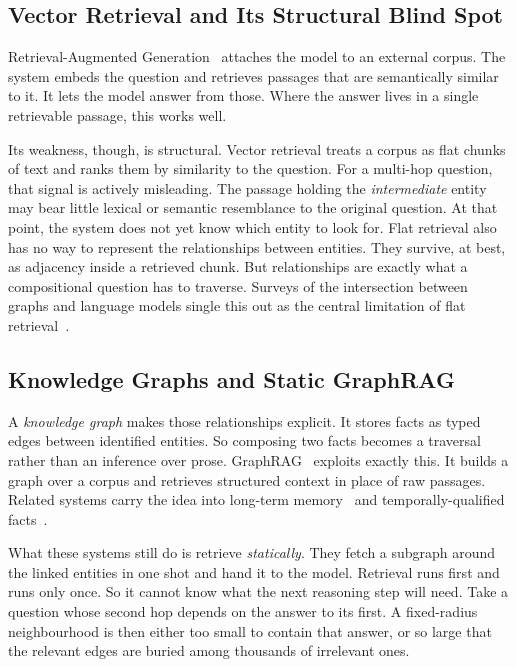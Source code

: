 \subsection{Vector Retrieval and Its Structural Blind Spot}

Retrieval-Augmented Generation~\cite{lewis2020retrieval} attaches the model to
an external corpus. The system embeds the question and retrieves passages that
are semantically similar to it. It lets the model answer from those. Where the
answer lives in a single retrievable passage, this works well.

Its weakness, though, is structural. Vector retrieval treats a corpus as flat
chunks of text and ranks them by similarity to the question. For a multi-hop
question, that signal is actively misleading. The passage holding the
\emph{intermediate} entity may bear little lexical or semantic resemblance to
the original question. At that point, the system does not yet know which entity
to look for. Flat retrieval also has no way to represent the relationships
between entities. They survive, at best, as adjacency inside a retrieved chunk.
But relationships are exactly what a compositional question has to traverse.
Surveys of the intersection between graphs and language models single this out
as the central limitation of flat retrieval~\cite{li2023survey}.

\subsection{Knowledge Graphs and Static GraphRAG}

A \emph{knowledge graph} makes those
relationships explicit. It stores facts as typed edges between
identified entities. So composing two facts becomes a traversal rather than an
inference over prose. GraphRAG~\cite{edge2024local} exploits exactly this. It
builds a graph over a corpus and retrieves structured context in place of raw
passages. Related systems carry the idea into long-term
memory~\cite{gutierrez2024hipporag} and temporally-qualified
facts~\cite{li2025tgrag}.

What these systems still do is retrieve \emph{statically}. They fetch a subgraph
around the linked entities in one shot and hand it to the model. Retrieval runs
first and runs only once. So it cannot know what the next reasoning step will
need. Take a question whose second hop depends on the answer to its first. A
fixed-radius neighbourhood is then either too small to contain that answer, or
so large that the relevant edges are buried among thousands of irrelevant ones.

